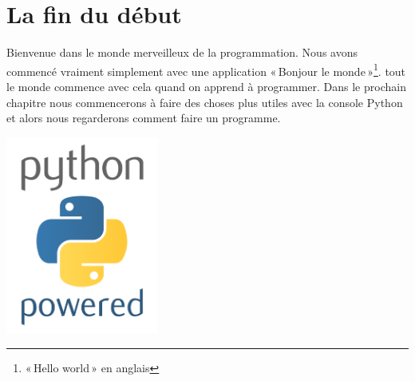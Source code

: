 \section*{La fin du début}

Bienvenue dans le monde merveilleux de la programmation. Nous avons commencé vraiment simplement avec une 
application « Bonjour le monde »\footnote{« Hello world » en anglais}. tout le monde commence avec cela quand on apprend à programmer. Dans le prochain chapitre nous commencerons à faire des choses plus utiles avec la console Python et alors nous regarderons comment faire un programme.

 \vfill
\begin{center}
 \includegraphics[width=5cm]{images/python.pdf}
\end{center}
 \vfill

\newpage
\thispagestyle{empty}
